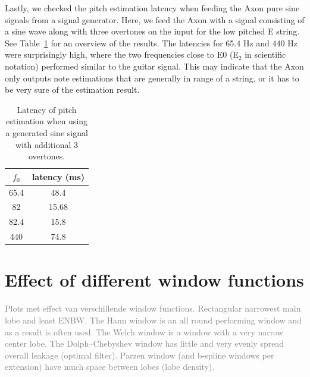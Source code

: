 \documentclass[a4paper,10pt,twocolumn]{article}
\newcommand{\note}[2]{#1${}_{#2}$}
\begin{document}
Lastly, we checked the pitch estimation latency when feeding the Axon pure sine signals from a signal generator. Here, we feed the Axon with a signal consisting of a sine wave along with three overtones on the input for the low pitched E string. See Table~\ref{tab:osc_siggen} for an overview of the results. The latencies for 65.4 Hz and 440 Hz were surprisingly high, where the two frequencies close to E0 (\note{E}{2} in scientific notation) performed similar to the guitar signal. This may indicate that the Axon only outputs note estimations that are generally in range of a string, or it has to be very sure of the estimation result.
\begin{table}[h]
    \centering
    \begin{tabular}{c|c}
        $f_0$ & latency (ms) \\
        \hline
        65.4 & 48.4 \\
        82   & 15.68 \\
        82.4 & 15.8 \\
        440  & 74.8
    \end{tabular}
    \caption{Latency of pitch estimation when using a generated sine signal with additional 3 overtones.}
    \label{tab:osc_siggen}
\end{table}



\section{Effect of different window functions}  \label{sec:windows}
\textcolor{gray}{Plots met effect van verschillende window functions. Rectangular narrowest main lobe and least ENBW. The Hann window is an all round performing window and as a result is often used. The Welch window is a window with a very narrow center lobe. The Dolph–Chebyshev window has little and very evenly spread overall leakage (optimal filter). Parzen window (and b-spline windows per extension) have much space between lobes (lobe density).}
\end{document}
